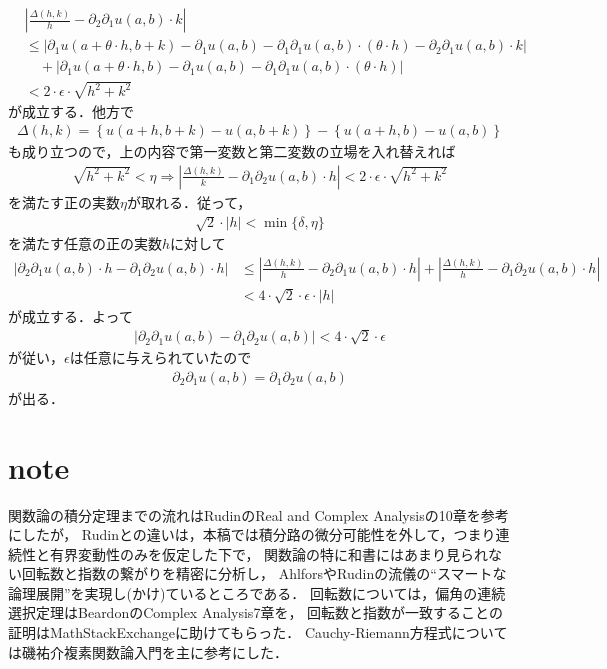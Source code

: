 \begin{sketch}
		\begin{align}
			&\left|\frac{\Delta(h,k)}{h} - \partial_2 \partial_1 u(a,b) \cdot k\right| \\
			&\leq \left|\partial_1 u(a+\theta \cdot h,b+k) - \partial_1 u(a,b) 
			- \partial_1 \partial_1 u(a,b) \cdot (\theta \cdot h) - \partial_2 \partial_1 u(a,b) \cdot k\right| \\
			&\quad + \left|\partial_1 u(a+\theta \cdot h,b) - \partial_1 u(a,b) 
			- \partial_1 \partial_1 u(a,b) \cdot (\theta \cdot h)\right| \\
			&< 2 \cdot \epsilon \cdot \sqrt{h^2 + k^2}
		\end{align}
		が成立する．他方で
		\begin{align}
			\Delta(h,k) = \left\{u(a+h,b+k) - u(a,b+k)\right\} - \left\{u(a+h,b) - u(a,b)\right\}
		\end{align}
		も成り立つので，上の内容で第一変数と第二変数の立場を入れ替えれば
		\begin{align}
			\sqrt{h^2 + k^2} < \eta \Longrightarrow 
			\left|\frac{\Delta(h,k)}{k} - \partial_1 \partial_2 u(a,b) \cdot h\right| 
			< 2 \cdot \epsilon \cdot \sqrt{h^2 + k^2}
		\end{align}
		を満たす正の実数$\eta$が取れる．従って，
		\begin{align}
			\sqrt{2} \cdot |h| < \min\{\delta,\eta\}
		\end{align}
		を満たす任意の正の実数$h$に対して
		\begin{align}
			\left|\partial_2 \partial_1 u(a,b) \cdot h - \partial_1 \partial_2 u(a,b) \cdot h\right|
			&\leq \left|\frac{\Delta(h,k)}{h} - \partial_2 \partial_1 u(a,b) \cdot h\right| 
			+ \left|\frac{\Delta(h,k)}{h} - \partial_1 \partial_2 u(a,b) \cdot h\right| \\
			&< 4 \cdot \sqrt{2} \cdot \epsilon \cdot |h|
		\end{align}
		が成立する．よって
		\begin{align}
			\left|\partial_2 \partial_1 u(a,b) - \partial_1 \partial_2 u(a,b)\right| < 4 \cdot \sqrt{2} \cdot \epsilon
		\end{align}
		が従い，$\epsilon$は任意に与えられていたので
		\begin{align}
			\partial_2 \partial_1 u(a,b) = \partial_1 \partial_2 u(a,b)
		\end{align}
		が出る．
		\QED
	\end{sketch}

\section{note}
	関数論の積分定理までの流れはRudinのReal and Complex Analysisの10章を参考にしたが，
	Rudinとの違いは，本稿では積分路の微分可能性を外して，つまり連続性と有界変動性のみを仮定した下で，
	関数論の特に和書にはあまり見られない回転数と指数の繋がりを精密に分析し，
	AhlforsやRudinの流儀の``スマートな論理展開''を実現し(かけ)ているところである．
	回転数については，偏角の連続選択定理はBeardonのComplex Analysis7章を，
	回転数と指数が一致することの証明はMathStackExchangeに助けてもらった．
	Cauchy-Riemann方程式については磯祐介複素関数論入門を主に参考にした．
	